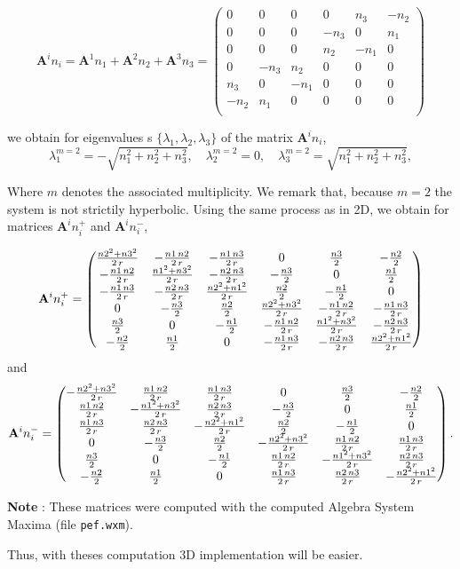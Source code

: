 \documentclass[a4paper,oneside,10pt]{report}
\begin{document}
\begin{equation}
\mathbf{A}^i n_i = \mathbf{A}^1 n_1 + \mathbf{A}^2 n_2  + \mathbf{A}^3 n_3 =
\begin{pmatrix}
0 & 0 & 0 & 0 & n_3 & -n_2\\
0 & 0 & 0 & -n_3 & 0 & n_1\\
0 & 0 & 0 & n_2 & -n_1 & 0\\
0 & -n_3 & n_2 & 0 & 0 & 0\\
n_3 & 0 & -n_1 & 0 & 0 & 0\\
-n_2 & n_1 & 0 & 0 & 0 & 0\\
\end{pmatrix}
\end{equation}


we obtain for eigenvalues s $\{\lambda_1,\lambda_2,\lambda_3\}$ of the matrix $\mathbf{A}^i n_i$, 
\begin{equation}
\label{eq:vp}
\lambda_1^{m=2} = -\sqrt{n_1^2 + n_2^2 + n_3^2},\quad \lambda_2^{m=2} =0,\quad \lambda_3^{m=2}  =  \sqrt{n_1^2 + n_2^2 + n_3^2},
\end{equation}

Where $m$ denotes the associated multiplicity. We remark that, because $m=2$ the system is not strictily hyperbolic. Using the same process as in 2D, we obtain for matrices $\mathbf{A}^in_i^+$ and $\mathbf{A}^in_i^-$,

\begin{equation}
\mathbf{A}^in_i^+=
\begin{pmatrix}
\frac{{n2}^{2}+{n3}^{2}}{2\,r} & -\frac{n1\,n2}{2\,r} & -\frac{n1\,n3}{2\,r} & 0 & \frac{n3}{2} & -\frac{n2}{2}\cr
 -\frac{n1\,n2}{2\,r} & \frac{{n1}^{2}+{n3}^{2}}{2\,r} & -\frac{n2\,n3}{2\,r} & -\frac{n3}{2} & 0 & \frac{n1}{2}\cr
 -\frac{n1\,n3}{2\,r} & -\frac{n2\,n3}{2\,r} & \frac{{n2}^{2}+{n1}^{2}}{2\,r} & \frac{n2}{2} & -\frac{n1}{2} & 0\cr
 0 & -\frac{n3}{2} & \frac{n2}{2} & \frac{{n2}^{2}+{n3}^{2}}{2\,r} & -\frac{n1\,n2}{2\,r} & -\frac{n1\,n3}{2\,r}\cr
 \frac{n3}{2} & 0 & -\frac{n1}{2} & -\frac{n1\,n2}{2\,r} & \frac{{n1}^{2}+{n3}^{2}}{2\,r} & -\frac{n2\,n3}{2\,r}\cr
 -\frac{n2}{2} & \frac{n1}{2} & 0 & -\frac{n1\,n3}{2\,r} & -\frac{n2\,n3}{2\,r} & \frac{{n2}^{2}+{n1}^{2}}{2\,r}
 \end{pmatrix}
  \end{equation}
 and
 \begin{equation}
 \mathbf{A}^in_i^-=
 \begin{pmatrix}
 -\frac{{n2}^{2}+{n3}^{2}}{2\,r} & \frac{n1\,n2}{2\,r} & \frac{n1\,n3}{2\,r} & 0 & \frac{n3}{2} & -\frac{n2}{2}\cr
 \frac{n1\,n2}{2\,r} & -\frac{{n1}^{2}+{n3}^{2}}{2\,r} & \frac{n2\,n3}{2\,r} & -\frac{n3}{2} & 0 & \frac{n1}{2}\cr 
 \frac{n1\,n3}{2\,r} & \frac{n2\,n3}{2\,r} & -\frac{{n2}^{2}+{n1}^{2}}{2\,r} & \frac{n2}{2} & -\frac{n1}{2} & 0\cr
 0 & -\frac{n3}{2} & \frac{n2}{2} & -\frac{{n2}^{2}+{n3}^{2}}{2\,r} & \frac{n1\,n2}{2\,r} & \frac{n1\,n3}{2\,r}\cr
 \frac{n3}{2} & 0 & -\frac{n1}{2} & \frac{n1\,n2}{2\,r} & -\frac{{n1}^{2}+{n3}^{2}}{2\,r} & \frac{n2\,n3}{2\,r}\cr
 -\frac{n2}{2} & \frac{n1}{2} & 0 & \frac{n1\,n3}{2\,r} & \frac{n2\,n3}{2\,r} & -\frac{{n2}^{2}+{n1}^{2}}{2\,r}
 \end{pmatrix}.
 \end{equation}


\textbf{Note} : These matrices were computed with the computed Algebra System Maxima (file \texttt{pef.wxm}).

Thus, with theses computation 3D implementation will be easier.



\end{document}
